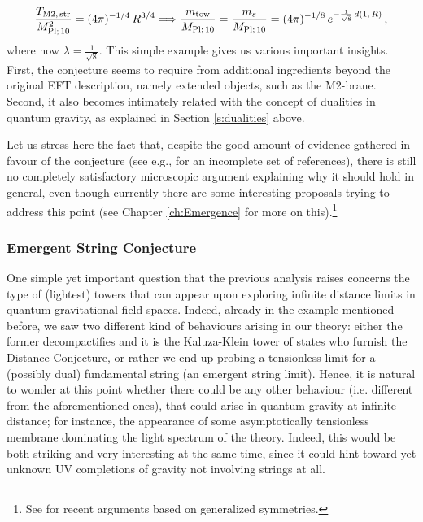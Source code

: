 %
\begin{equation}
\frac{T_{\rm M2,\, str}}{M_{\text{Pl};\, 10}^2}=  (4\pi)^{-1/4}\, R^{3/4} \Longrightarrow \frac{m_{\rm tow}}{M_{\text{Pl};\, 10}} = \frac{m_s}{M_{\text{Pl};\, 10}} = (4\pi)^{-1/8}\, e^{-\frac{1}{\sqrt{8}}\, d(1,\, R)}\, ,
\end{equation}
%
where now $\lambda = \frac{1}{\sqrt{8}}$. This simple example gives us various important insights. First, the conjecture seems to require from additional ingredients beyond the original EFT description, namely extended objects, such as the M2-brane. Second, it also becomes intimately related with the concept of dualities in quantum gravity, as explained in Section \ref{s:dualities} above.

Let us stress here the fact that, despite the good amount of evidence gathered in favour of the conjecture (see e.g., \cite{Montero:2015ofa,Baume:2016psm,Klaewer:2016kiy,Valenzuela:2016yny,Blumenhagen:2017cxt,Palti:2017elp,Hebecker:2017lxm,Grimm:2018ohb,Heidenreich:2018kpg,Blumenhagen:2018nts,Landete:2018kqf,Lee:2018urn,Reece:2018zvv,Lee:2018spm,Ooguri:2018wrx,Grimm:2018cpv,Buratti:2018xjt,Hebecker:2018fln,Gonzalo:2018guu,Corvilain:2018lgw,Lee:2019tst,Blumenhagen:2019qcg,Joshi:2019nzi,Font:2019cxq,Lee:2019xtm,Grimm:2019wtx,Lee:2019wij, Erkinger:2019umg, EnriquezRojo:2020hzi,Gendler:2020dfp,Grimm:2020cda,Bastian:2020egp,Baume:2020dqd, Perlmutter:2020buo, Calderon-Infante:2020dhm,Grimm:2020ouv, Ooguri:2024ofs,Aoufia:2024awo,Lanza:2020qmt, Lanza:2021udy, Lanza:2022zyg} for an incomplete set of references), there is still no completely satisfactory microscopic argument explaining why it should hold in general, even though currently there are some interesting proposals trying to address this point (see Chapter \ref{ch:Emergence} for more on this).\footnote{See \cite{Rudelius:2024vmc} for recent arguments based on generalized symmetries.}

\subsubsection*{Emergent String Conjecture}

One simple yet important question that the previous analysis raises concerns the type of (lightest) towers that can appear upon exploring infinite distance limits in quantum gravitational field spaces. Indeed, already in the example mentioned before, we saw two different kind of behaviours arising in our theory: either the former decompactifies and it is the Kaluza-Klein tower of states who furnish the Distance Conjecture, or rather we end up probing a tensionless limit for a (possibly dual) fundamental string (an emergent string limit). Hence, it is natural to wonder at this point whether there could be any other behaviour (i.e. different from the aforementioned ones), that could arise in quantum gravity at infinite distance; for instance, the appearance of some asymptotically tensionless membrane dominating the light spectrum of the theory. Indeed, this would be both striking and very interesting at the same time, since it could hint toward yet unknown UV completions of gravity not involving strings at all. 

